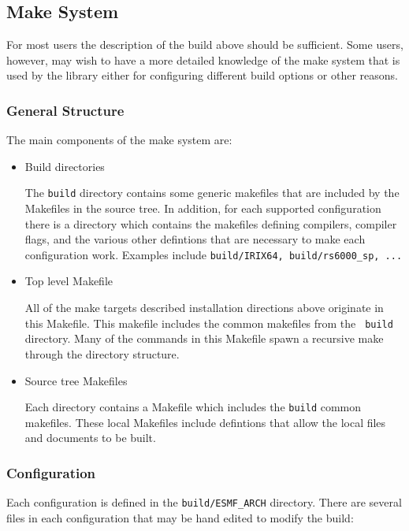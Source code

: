 
\subsection{Make System}
For most users the description of the build above should be sufficient.  Some
users, however, may wish to have a more detailed knowledge of the make system
that is used by the library either for configuring different build options or
other reasons.
\subsubsection{General Structure}
The main components of the make system are:
\begin{itemize}
\item{Build directories}

The {\tt build} directory contains some generic makefiles that are included by
the Makefiles in the source tree.  In addition, for each supported
configuration there is a directory which contains the makefiles defining
compilers, compiler flags, and the various other defintions that are necessary
to make each configuration work.  Examples include {\tt build/IRIX64,
build/rs6000\_sp, ...}

\item{Top level Makefile}

All of the make targets described installation directions above originate in
this Makefile.  This makefile includes the common makefiles from the {\tt
build} directory.  Many of the commands in this Makefile spawn a recursive make
through the directory structure.

\item{Source tree Makefiles}

Each directory contains a Makefile which includes the {\tt build} common
makefiles.  These local Makefiles include defintions that allow the local files
and documents to be built.
\end{itemize}

\subsubsection{Configuration}

Each configuration is defined in the {\tt build/ESMF\_ARCH} directory.  There
are several files in each configuration that may be hand edited to modify the
build:

